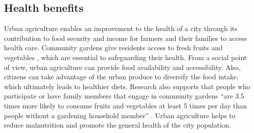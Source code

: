 %
%

\subsection{Health benefits}

Urban agriculture enables an improvement to the health of a city through its contribution to food security \cite{Opitz2016} and income for farmers and their families to access health care. Community gardens give residents access to fresh fruits and vegetables \cite{Larsen2009}, which are essential to safeguarding their health. From a social point of view, urban agriculture can provide food availability and accessibility. Also, citizens can take advantage of the urban produce to diversify the food intake, which ultimately leads to healthier diets. Research also supports that people who participate or have family members that engage in community gardens “are 3.5 times more likely to consume fruits and vegetables at least 5 times per day than people without a gardening household member” \cite{Alaimo2008}. Urban agriculture helps to reduce malnutrition and promote the general health of the city population.

